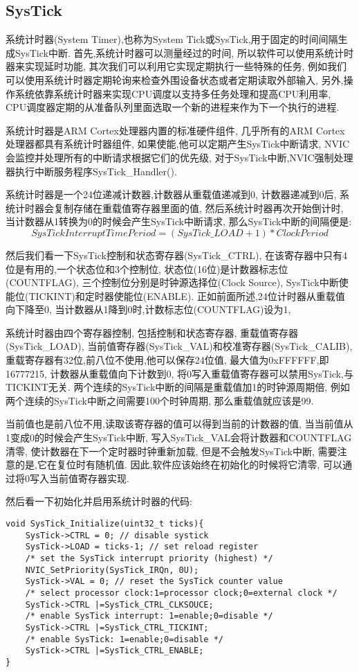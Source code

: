 \subsection{SysTick}
系统计时器(System Timer),也称为System Tick或SysTick,用于固定的时间间隔生成SysTick中断.
首先,系统计时器可以测量经过的时间,
所以软件可以使用系统计时器来实现延时功能,
其次我们可以利用它实现定期执行一些特殊的任务,
例如我们可以使用系统计时器定期轮询来检查外围设备状态或者定期读取外部输入,
另外,操作系统依靠系统计时器来实现CPU调度以支持多任务处理和提高CPU利用率,
CPU调度器定期的从准备队列里面选取一个新的进程来作为下一个执行的进程.

系统计时器是ARM Cortex处理器内置的标准硬件组件,
几乎所有的ARM Cortex处理器都具有系统计时器组件,
如果使能,他可以定期产生SysTick中断请求,
NVIC会监控并处理所有的中断请求根据它们的优先级,
对于SysTick中断,NVIC强制处理器执行中断服务程序SysTick\_Handler().

系统计时器是一个24位递减计数器,计数器从重载值递减到0,
计数器递减到0后,
系统计时器会复制存储在重载值寄存器里面的值,
然后系统计时器再次开始倒计时,
当计数器从1转换为0的时候会产生SysTick中断请求,
那么SysTick中断的间隔便是:
$$SysTick Interrupt  Time Period  = (SysTick\_LOAD + 1 ) * Clock Period$$

然后我们看一下SysTick控制和状态寄存器(SysTick\_CTRL),
在该寄存器中只有4位是有用的,一个状态位和3个控制位,
状态位(16位)是计数器标志位(COUNTFLAG),
三个控制位分别是时钟源选择位(Clock Source),
SysTick中断使能位(TICKINT)和定时器使能位(ENABLE).
正如前面所述,24位计时器从重载值向下降至0,
当计数器从1降到0时,计数标志位(COUNTFLAG)设为1,

系统计时器由四个寄存器控制,
包括控制和状态寄存器,
重载值寄存器(SysTick\_LOAD),
当前值寄存器(SysTick\_VAL)和校准寄存器(SysTick\_CALIB),
重载寄存器有32位,前八位不使用,他可以保存24位值,
最大值为0xFFFFFF,即16777215,
计数器从重载值向下计数到0,
将0写入重载值寄存器可以禁用SysTick,与TICKINT无关.
两个连续的SysTick中断的间隔是重载值加1的时钟源周期倍,
例如两个连续的SysTick中断之间需要100个时钟周期,
那么重载值就应该是99.

当前值也是前八位不用,读取该寄存器的值可以得到当前的计数器的值,
当当前值从1变成0的时候会产生SysTick中断,
写入SysTick\_VAL会将计数器和COUNTFLAG清零,
使计数器在下一个定时器时钟重新加载,
但是不会触发SysTick中断,
需要注意的是,它在复位时有随机值.
因此,软件应该始终在初始化的时候将它清零,
可以通过将0写入当前值寄存器实现.

然后看一下初始化并启用系统计时器的代码:
\begin{lstlisting}[language={[ANSI]C},keywordstyle=\color{blue!70},commentstyle=\color{red!50!green!50!blue!50},frame=shadowbox, rulesepcolor=\color{red!20!green!20!blue!20}]
void SysTick_Initialize(uint32_t ticks){
    SysTick->CTRL = 0; // disable systick
    SysTick->LOAD = ticks-1; // set reload register
    /* set the SysTick interrupt priority (highest) */
    NVIC_SetPriority(SysTick_IRQn, 0U);
    SysTick->VAL = 0; // reset the SysTick counter value
    /* select processor clock:1=processor clock;0=external clock */
    SysTick->CTRL |=SysTick_CTRL_CLKSOUCE;
    /* enable SysTick interrupt: 1=enable;0=disable */
    SysTick->CTRL |=SysTick_CTRL_TICKINT;
    /* enable SysTick: 1=enable;0=disable */
    SysTick->CTRL |=SysTick_CTRL_ENABLE;
}
\end{lstlisting}

